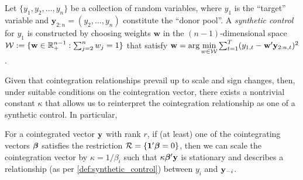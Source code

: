 
\begin{definition}\label{def:synthetic_control}
Let $\{y_1, y_2, \dots, y_n\}$ be a collection of random variables, where $y_1$ is the ``target'' variable and 
$\mathbf{y}_{2:n} = (y_2,\dots,y_n)$ constitute the ``donor pool''. A \emph{synthetic control} for 
$y_1$ is constructed by choosing weights $\mathbf{w}$ in the $(n-1)$-dimensional space
$\mathcal{W} := \{\mathbf{w}\in\mathbb{R}_{+}^{n-1}: \sum_{j=2}^n w_j=1\}$
that satisfy
$\mathbf w=\arg\underset{w\in\mathcal{W}}{\min} 
\sum_{t=1}^T 
(y_{1,t}-\mathbf w'\mathbf y_{2:n,t})^2$.
\end{definition}


Given that cointegration relationships prevail up to scale and sign changes, then, under suitable conditions on the cointegration vector, there exists a nontrivial constant $\kappa$ that allows us to reinterpret the cointegration relationship as one of a synthetic control. In particular,
\begin{proposition} 
For a cointegrated vector $\mathbf y$  with rank $r$, if (at least) one of the cointegrating vectors $\boldsymbol \beta$ satisfies the restriction
$\mathcal R=
\{
\mathbf 1' \boldsymbol \beta  = 0
\}$,
 then we can scale the cointegration vector by $\kappa=1/\beta_i$ such that $\kappa \boldsymbol \beta ' \mathbf y$ is stationary and describes a  relationship (as per \cref{def:synthetic_control}) between $y_i$ and $\mathbf y_{-i}$. 
\end{proposition}

